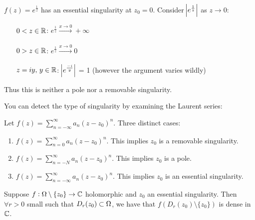 \begin{example}
$f(z) = e^{\frac{1}{z}}$ has an essential singularity at $z_0 = 0$. Consider $\abs{e^{\frac{1}{z}}}$ as $z\to 0$:
\begin{enumerate}
    \item[$0<z \in \mathbb{R}$:] $e^{\frac{1}{z}} \xrightarrow[]{x \to 0} +\infty$\\
    \item[$0>z \in \mathbb{R}$:] $e^{\frac{1}{z}} \xrightarrow[]{x \to 0} 0$\\
    \item[$z = iy,\, y \in \mathbb{R}$:] $\abs{e^{\frac{-i}{y}}}$ = 1 (however the argument varies wildly)
\end{enumerate}

Thus this is neither a pole nor a removable singularity.
\end{example}

You can detect the type of singularity by examining the Laurent series:

\begin{note}
Let $f(z) = \sum_{n=-\infty}^\infty a_n (z-z_0)^n$. Three distinct cases:

\begin{enumerate}
    \item $f(z) = \sum_{n=0}^\infty a_n (z-z_0)^n$. This implies $z_0$ is a removable singularity.
    
    \item $f(z) = \sum_{n=-N}^\infty a_n (z-z_0)^n$. This implies $z_0$ is a pole.
    
    \item $f(z) = \sum_{n=-\infty}^\infty a_n (z-z_0)^n$. This implies $z_0$ is an essential singularity.
\end{enumerate}


\end{note}

\begin{theorem}\label{thm:caso-weier}
Suppose $f: \Omega \setminus \{ z_0 \} \to \mathbb{C}$ holomorphic and $z_0$ an essential singularity. Then $\forall r> 0$ small such that $D_r(z_0) \subset \Omega$, we have that $f(D_r(z_0) \setminus \{ z_0 \})$ is dense in $\mathbb{C}$.
\end{theorem}



